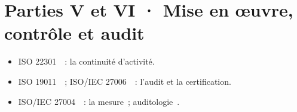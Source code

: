 \section*{Parties V et VI · Mise en œuvre, contrôle et audit}
\begin{itemize}
    \item ISO 22301~\cite{iso22301}~: la continuité d'activité.
    \item ISO 19011~\cite{iso19011}~; ISO/IEC 27006~\cite{iso27006}~: l'audit et la certification.
    \item ISO/IEC 27004~\cite{iso27004}~: la mesure~; auditologie~\cite{minka2026auditologie}.
\end{itemize}
